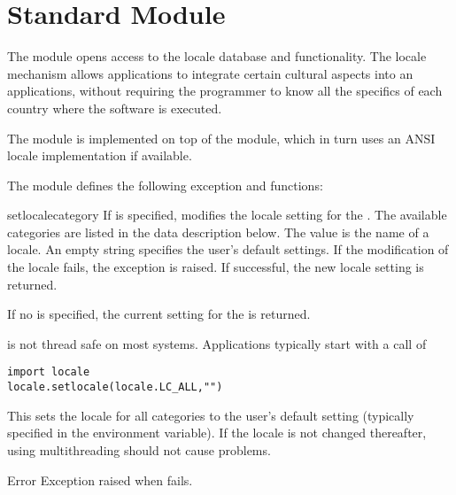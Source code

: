 \section{Standard Module }

\label{module-locale}

The  module opens access to the \POSIX{} locale database
and functionality. The \POSIX{} locale mechanism allows applications
to integrate certain cultural aspects into an applications, without
requiring the programmer to know all the specifics of each country
where the software is executed.

The  module is implemented on top of the
 module, which in turn uses an
ANSI \C{} locale implementation if available.

The  module defines the following exception and
functions:


\begin{funcdesc}{setlocale}{category}
If  is specified, modifies the locale setting for the
. The available categories are listed in the data
description below. The value is the name of a locale. An empty string
specifies the user's default settings. If the modification of the
locale fails, the exception  is
raised. If successful, the new locale setting is returned.

If no  is specified, the current setting for the
 is returned.

 is not thread safe on most systems. Applications
typically start with a call of
\begin{verbatim}
import locale
locale.setlocale(locale.LC_ALL,"")
\end{verbatim}
This sets the locale for all categories to the user's default setting
(typically specified in the  environment variable). If the
locale is not changed thereafter, using multithreading should not
cause problems.
\end{funcdesc}

\begin{excdesc}{Error}
Exception raised when  fails.
\end{excdesc}

